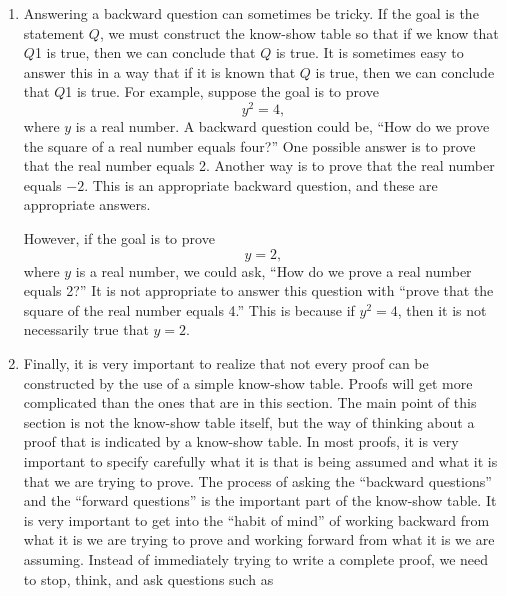 \begin{enumerate}
\item Answering a backward question can sometimes be tricky.  If the goal is the statement  $Q$, we must construct the know-show table so that if we know that  $Q$1 is true, then we can conclude that $Q$ is true.  It is sometimes easy to answer this in a way that if it is known that  $Q$ is true, then we can conclude that $Q$1 is true.  For example, suppose the goal is to prove 
\[
y^2  = 4,
\]
where  $y$  is a real number.  A backward question could be, ``How do we prove the square of a real number equals four?''  One possible answer is to prove that the real number equals 2.  Another way is to prove that the real number equals $-2$.  This is an appropriate backward question, and these are appropriate answers.

However, if the goal is to prove
\[
y = 2,
\]
where  $y$  is a real number, we could ask, ``How do we prove a real number equals 2?''  It is not appropriate to answer this question with ``prove that the square of the real number equals 4.''  
This is because if $y^2=4$, then it is not necessarily true that $y=2$.

\item Finally, it is very important to realize that not every proof can be constructed by the use of a simple know-show table.  Proofs will get more complicated than the ones that are in this section.  The main point of this section is not the know-show table itself, but the way of thinking about a proof that is indicated by a know-show table.  In most proofs, it is very important to specify carefully what it is that is being assumed and what it is that we are trying to prove.  The process of asking the ``backward questions'' and the ``forward questions'' is the important part of the know-show table.  It is very important to get into the ``habit of mind'' of working backward from what it is we are trying to prove and working forward from what it is we are assuming.  Instead of immediately trying to write a complete proof, we need to stop, think, and ask questions such as


\end{enumerate}
